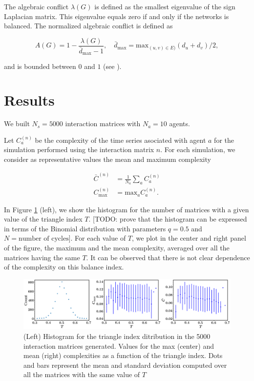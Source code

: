\documentclass[10pt]{article}
\begin{document}
The algebraic conflict $\lambda(G)$ is defined as the smallest eigenvalue of the sign Laplacian matrix. This eigenvalue equals zero if and only if the networks is balanced. The normalized algebraic conflict is defined as 

\begin{equation}
A(G) = 1 - \dfrac{\lambda(G)}{\bar{d}_{\mathrm{max}} - 1},\quad \bar{d}_{\mathrm{max}} = \mathrm{max}_{(u,v)\in E)} (d_u + d_v) / 2,
\end{equation}

and is bounded between $0$ and $1$ (see \cite{Belardo}).

\section{Results}

We built $N_s = 5000$ interaction matrices with $N_a = 10$ agents.
 
Let $C_a^{(n)}$ be the complexity of the time series asociated with agent $a$ for the simulation performed using the interaction matrix $n$. For each simulation, we consider as representative values the mean and maximum complexity

\begin{align}
  \bar{C}^{(n)} &= \frac{1}{N_a} \sum_a C_a^{(n)} \\
  C_{\mathrm{max}}^{(n)} &= \mathrm{max}_a C_a^{(n)}.
\end{align}


In Figure \ref{C_vs_T} (left), we show the histogram for the number of matrices with a given value of the triangle index $T$. [TODO: prove that the histogram can be expressed in terms of the Binomial distribution with parameters $q = 0.5$ and $N = \text{number of cycles}$]. For each value of $T$, we plot in the center and right panel of the figure, the maximum and the mean complexity, averaged over all the matrices having the same $T$. It can be observed that there is not clear dependence of the complexity on this balance index. 

\begin{figure}[H]
	\centering
\includegraphics[scale=0.27]{../figs/C_vs_T.png}
	\caption{(Left) Histogram for the triangle index ditribution in the 5000 interaction matrices generated. Values for the max (center) and mean (right) complexities as a function of the triangle index. Dots and bars represent the mean and standard deviation computed over all the matrices with the same value of $T$ \label{C_vs_T}}
\end{figure}
\end{document}
